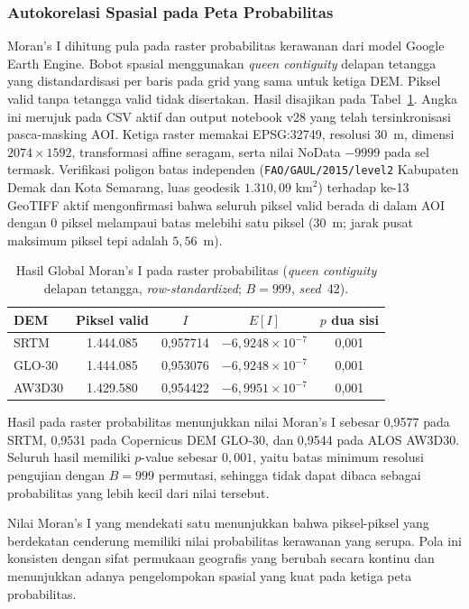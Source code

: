 \documentclass[12pt]{article}
\begin{document}
\subsubsection{Autokorelasi Spasial pada Peta Probabilitas}

Moran's I dihitung pula pada raster probabilitas kerawanan dari model Google
Earth Engine. Bobot spasial menggunakan \textit{queen contiguity} delapan
tetangga yang distandardisasi per baris pada grid yang sama untuk ketiga DEM.
Piksel valid tanpa tetangga valid tidak disertakan. Hasil disajikan pada
Tabel~\ref{tab:moran-raster}. Angka ini merujuk pada CSV aktif dan output notebook
v28 yang telah tersinkronisasi pasca-masking AOI. Ketiga raster memakai
EPSG:32749, resolusi 30~m, dimensi $2074\times1592$, transformasi affine
seragam, serta nilai NoData $-9999$ pada sel termask. Verifikasi poligon
batas independen (\texttt{FAO/GAUL/2015/level2} Kabupaten Demak dan Kota
Semarang, luas geodesik $1.310{,}09\text{ km}^2$) terhadap ke-13 GeoTIFF
aktif mengonfirmasi bahwa seluruh piksel valid berada di dalam AOI dengan 0
piksel melampaui batas melebihi satu piksel ($30$~m; jarak pusat maksimum
piksel tepi adalah $5{,}56$~m).

\begin{table}[ht]
\centering
\caption{Hasil Global Moran's I pada raster probabilitas (\textit{queen
contiguity} delapan tetangga, \textit{row-standardized}; $B=999$, \textit{seed}~42).}
\label{tab:moran-raster}
\begin{tabular}{lcccc}
\toprule
\textbf{DEM} & \textbf{Piksel valid} & \textbf{$I$} & \textbf{$E[I]$} & \textbf{$p$ dua sisi} \\
\midrule
SRTM   & 1.444.085 & 0,957714 & $-6{,}9248 \times 10^{-7}$ & 0,001 \\
GLO-30 & 1.444.085 & 0,953076 & $-6{,}9248 \times 10^{-7}$ & 0,001 \\
AW3D30 & 1.429.580 & 0,954422 & $-6{,}9951 \times 10^{-7}$ & 0,001 \\
\bottomrule
\end{tabular}
\end{table}

Hasil pada raster probabilitas menunjukkan nilai Moran's I sebesar 0,9577
pada SRTM, 0,9531 pada Copernicus DEM GLO-30, dan 0,9544 pada ALOS AW3D30.
Seluruh hasil memiliki $p$-value sebesar $0{,}001$, yaitu batas minimum
resolusi pengujian dengan $B=999$ permutasi, sehingga tidak dapat dibaca
sebagai probabilitas yang lebih kecil dari nilai tersebut.

Nilai Moran's I yang mendekati satu menunjukkan bahwa piksel-piksel yang
berdekatan cenderung memiliki nilai probabilitas kerawanan yang serupa. Pola
ini konsisten dengan sifat permukaan geografis yang berubah secara kontinu
dan menunjukkan adanya pengelompokan spasial yang kuat pada ketiga peta
probabilitas.
\end{document}
